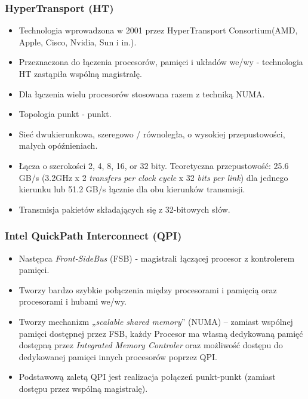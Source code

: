 		\subsubsection{HyperTransport (HT)}
			\begin{itemize}
				\item Technologia wprowadzona w 2001 przez HyperTransport Consortium(AMD, Apple, Cisco, Nvidia, Sun i in.).
				\item Przeznaczona do łączenia procesorów, pamięci i układów we/wy - technologia HT zastąpiła wspólną magistralę.
				\item Dla łączenia wielu procesorów stosowana razem z techniką NUMA.
				\item Topologia punkt - punkt.
				\item Sieć dwukierunkowa, szeregowo / równoległa, o wysokiej przepustowości, małych opóźnieniach.
				\item Łącza o szerokości 2, 4, 8, 16, or 32 bity. Teoretyczna przepustowość: 25.6 GB/s (3.2GHz x 2 \textit{transfers per clock cycle} x 32 \textit{bits per link}) dla jednego kierunku lub 51.2 GB/s łącznie dla obu kierunków transmisji.
				\item Transmisja pakietów składających się z 32-bitowych słów.
			\end{itemize}
		\subsubsection{Intel QuickPath Interconnect (QPI)}
			\begin{itemize}
				\item Następca \emph{Front-SideBus} (FSB) - magistrali łączącej procesor z kontrolerem pamięci.
				\item Tworzy bardzo szybkie połączenia między procesorami i pamięcią oraz procesorami i hubami we/wy.
				\item Tworzy mechanizm „\emph{scalable shared memory}” (NUMA) – zamiast wspólnej pamięci dostępnej przez FSB, każdy Procesor ma własną dedykowaną pamięć dostępną przez \textit{Integrated Memory Controler} oraz możliwość dostępu do dedykowanej pamięci innych procesorów poprzez QPI.
				\item Podstawową zaletą QPI jest realizacja połączeń punkt-punkt (zamiast dostępu przez wspólną magistralę).
			\end{itemize}
				
